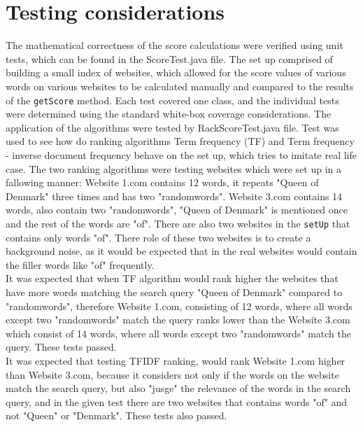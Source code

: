 \section{Testing considerations}
The mathematical correctness of the score calculations were verified using unit tests, which can be found in the ScoreTest.java file.
The set up comprised of building a small index of websites, which allowed for the score values of various words on various
websites to be calculated manually and compared to the results of the {\tt getScore} method.
Each test covered one class, and the individual tests were determined using the standard white-box coverage considerations.
The application of the algorithms were tested by RackScoreTest.java file. Test was used to see how do ranking algorithms Term frequency (TF) and Term frequency - inverse document frequency  behave on the set up, which tries to imitate real life case. The two ranking algorithms were testing websites which were set up in a fallowing manner: Website 1.com contains 12 words, it repeats "Queen of Denmark" three times and has two "randomwords". Website 3.com contains 14 words, also contain two "randomwords", "Queen of Denmark" is mentioned once and the rest of the words are "of". There are also two websites in the {\tt setUp} that contains only words "of". There role of these two websites is to create a background noise, as it would be expected that in the real websites would contain the filler words like "of" frequently. \\
It was expected that when TF algorithm would rank higher the websites that have more words matching the search query "Queen of Denmark" compared to "randomwords", therefore Website 1.com, consisting of 12 words, where all words except two "randomwords" match the query ranks lower than the Website 3.com which consist of 14 words, where all words except two "randomwords" match the query. These tests passed.\\
It was expected that testing TFIDF ranking, would rank Website 1.com higher than Website 3.com, because it considers not only if the words on the website match the search query, but also "jusge" the relevance of the words in the search query, and in the given test there are two websites that contains words "of" and not "Queen" or "Denmark". These tests also passed. 

